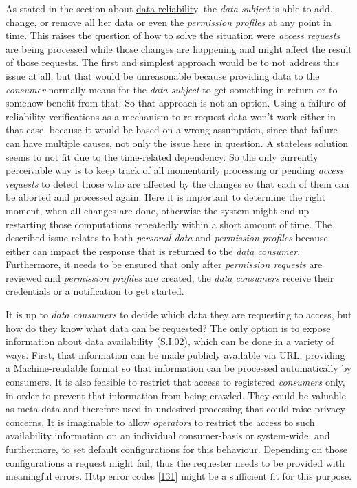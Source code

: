 \documentclass[12pt,english,a4paper,titlepage,cleardoublepage=empty,dottedtoc]{report}
\begin{document}
As stated in the section about \protect\hyperlink{data-reliability}{data
reliability}, the \emph{data subject} is able to add, change, or remove
all her data or even the \emph{permission profiles} at any point in
time. This raises the question of how to solve the situation were
\emph{access requests} are being processed while those changes are
happening and might affect the result of those requests. The first and
simplest approach would be to not address this issue at all, but that
would be unreasonable because providing data to the \emph{consumer}
normally means for the \emph{data subject} to get something in return or
to somehow benefit from that. So that approach is not an option. Using a
failure of reliability verifications as a mechanism to re-request data
won't work either in that case, because it would be based on a wrong
assumption, since that failure can have multiple causes, not only the
issue here in question. A stateless solution seems to not fit due to the
time-related dependency. So the only currently perceivable way is to
keep track of all momentarily processing or pending \emph{access
requests} to detect those who are affected by the changes so that each
of them can be aborted and processed again. Here it is important to
determine the right moment, when all changes are done, otherwise the
system might end up restarting those computations repeatedly within a
short amount of time. The described issue relates to both \emph{personal
data} and \emph{permission profiles} because either can impact the
response that is returned to the \emph{data consumer}. Furthermore, it
needs to be ensured that only after \emph{permission requests} are
reviewed and \emph{permission profiles} are created, the \emph{data
consumers} receive their credentials or a notification to get started.

It is up to \emph{data consumers} to decide which data they are
requesting to access, but how do they know what data can be requested?
The only option is to expose information about data availability
(\protect\hyperlink{si02}{S.I.02}), which can be done in a variety of
ways. First, that information can be made publicly available via URL,
providing a Machine-readable format so that information can be processed
automatically by consumers. It is also feasible to restrict that access
to registered \emph{consumers} only, in order to prevent that
information from being crawled. They could be valuable as meta data and
therefore used in undesired processing that could raise privacy
concerns. It is imaginable to allow \emph{operators} to restrict the
access to such availability information on an individual consumer-basis
or system-wide, and furthermore, to set default configurations for this
behaviour. Depending on those configurations a request might fail, thus
the requester needs to be provided with meaningful errors. Http error
codes {[}\protect\hyperlink{ref-web_spec_http-error-codes}{131}{]} might
be a sufficient fit for this purpose.
\end{document}
